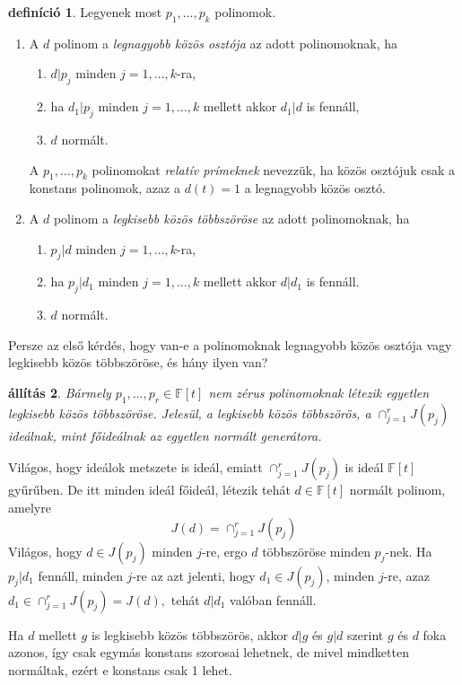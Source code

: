 \documentclass[9pt, a4paper, showtrims]{memoir}
\makeatletter
\renewenvironment{proof}[1][\proofname]
    {\par\pushQED{\qed}%
    \normalfont \topsep6\p@\@plus6\p@\relax
    \trivlist
    \item[\hskip\labelsep
        \itshape
    #1\@addpunct{:}]\ignorespaces}
    {\popQED\endtrivlist\@endpefalse}
\theoremstyle{plain}
\newtheorem{proposition}{állítás}[chapter]
\theoremstyle{remark}
\theoremstyle{definition}
\newtheorem{definition}[proposition]{definíció}
\makeatother
\begin{document}
\begin{definition}
	Legyenek most $p_1,\ldots,p_k$ polinomok.
	\begin{enumerate}
		\item A $d$ polinom a \emph{legnagyobb közös osztója} az adott polinomoknak,
		      ha
		      \begin{enumerate}
			      \item $d|p_j$ minden $j=1,\ldots,k$-ra,
			      \item ha $d_1|p_j$ minden $j=1,\ldots,k$ mellett akkor $d_1|d$ is fennáll,
			      \item $d$ normált.
		      \end{enumerate}
		      A $p_1,\ldots,p_k$ polinomokat \emph{relatív prímeknek} nevezzük,
		      ha közös osztójuk csak a konstans polinomok,
		      azaz a $d\left( t \right)=1$ a legnagyobb közös osztó.
		\item A $d$ polinom a \emph{legkisebb közös többszöröse} az adott polinomoknak,
		      ha
		      \begin{enumerate}
			      \item $p_j|d$ minden $j=1,\ldots,k$-ra,
			      \item ha $p_j|d_1$ minden $j=1,\ldots,k$ mellett akkor $d|d_1$ is fennáll.
			      \item $d$ normált.\qedhere
		      \end{enumerate}
	\end{enumerate}
\end{definition}
Persze az első kérdés, hogy van-e a polinomoknak legnagyobb közös osztója vagy legkisebb közös többszöröse, és hány ilyen van?
\begin{proposition}\label{pr:lkkt}
	Bármely $p_1,\ldots,p_r\in\mathbb{F}\left[ t \right]$ nem zérus polinomoknak
	létezik egyetlen legkisebb közös többszöröse.
	Jelesül, a legkisebb közös többszörös, a
	\(
	\cap_{j=1}^rJ\left( p_j \right)
	\) ideálnak, mint főideálnak az egyetlen normált generátora.
\end{proposition}
\begin{proof}
	Világos, hogy ideálok metszete is ideál, emiatt
	\(
	\cap_{j=1}^rJ\left( p_j \right)
	\)
	is ideál $\mathbb{F}\left[ t \right]$ gyűrűben.
	De itt minden ideál főideál, létezik tehát $d\in\mathbb{F}\left[ t \right]$ normált polinom, amelyre
	\[
		J\left( d \right)
		=
		\cap_{j=1}^rJ\left( p_j \right)
	\]
	Világos, hogy $d\in J\left( p_j \right)$ minden $j$-re,
	ergo $d$ többszöröse minden $p_j$-nek.
	Ha $p_j|d_1$ fennáll, minden $j$-re
	az azt jelenti, hogy $d_1\in J\left( p_j \right)$, minden $j$-re, azaz
	\(
	d_1
	\in
	\cap_{j=1}^rJ\left( p_j \right)
	=
	J\left( d \right),
	\)
	tehát $d|d_1$ valóban fennáll.

	Ha $d$ mellett $g$ is legkisebb közös többszörös, akkor $d|g$ és $g|d$ szerint $g$ és $d$ foka azonos,
	így csak egymás konstans szorosai lehetnek, de mivel mindketten normáltak, ezért e konstans csak 1 lehet.
\end{proof}
\end{document}
